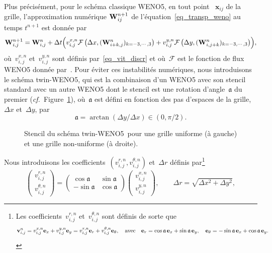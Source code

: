 \documentclass[11pt]{amsart}
\numberwithin{equation}{section}
\newcommand{\W}{{\bf W}}
\newcommand{\ang}{{\mathfrak{a}}}
\newcommand{\ex}{{\bf e}_x}
\newcommand{\ey}{{\bf e}_y}
\newcommand{\er}{{\bf e}_r}
\newcommand{\et}{{\bf e}_{\theta}}
\newcommand{\vit}{\mathbf{v}}
\newcommand{\vecx}{\mathbf{x}}
\newcommand{\twinweno}{twin-WENO5}
\newcommand{\cf}{\textit{cf.}~}
\begin{document}
Plus précisément, pour le schéma classique WENO5, en tout point 
~$\vecx_{ij}$ de la grille, l'approximation numérique 
$\W^{n+1}_{ij}$ de l'équation~\eqref{eq_transp_weno} au temps 
$t^{n+1}$ est donnée par
\begin{equation}\label{eq:WENO5}
\W^{n+1}_{i,j}=\W^n_{i,j} + \Delta t \Bigl(v_{i,j}^{x,n}
\mathcal{F}\left(\Delta x,(\W^n_{i+k,j})_{k=-3,\cdots, 3}\right) +
v_{i,j}^{y,n} \mathcal{F}\left(\Delta y,(\W^n_{i,j+k})_{k=-3,\cdots, 3}\right)\Bigr),
\end{equation}
où~$v_{i,j}^{x,n} $ et~$v_{i,j}^{y,n}$ sont définis par~\eqref{eq_vit_discr} et où~$\mathcal{F}$ est le fonction de flux WENO5 donnée par~\cite{Liu1994}. 
Pour éviter ces instabilités numériques, nous introduisons le schéma \twinweno, qui est la combinaison d'un WENO5 avec son stencil standard avec un autre WENO5 dont le stencil est une rotation d'angle~$\ang$ du premier (\cf Figure~\ref{fig:stencil_weno5_twin}), où~$\ang$ est défini en fonction des pas d'espaces de la grille, $\Delta x$ et~$\Delta y$, par 
 $$\ang=\arctan (\Delta y/\Delta x)\in (0,\pi/2). $$
\begin{figure}[h]
  \centering
\subfloat[Grille uniforme~$\thickmuskip=1mu  \Delta x=\Delta y$]{}
\caption{Stencil du schéma \twinweno\ pour une grille uniforme (à gauche)
  et une grille non-uniforme (à droite).} \label{fig:stencil_weno5_twin}
\end{figure} 
Nous introduisons les coefficients~$(v^{r,n}_{i,j},
v^{\theta,n}_{i,j})$ et~$\Delta r$ définis par\footnote{Les coefficients~$v^{r,n}_{i,j}$
  et~$v^{\theta,n}_{i,j}$ sont définis de sorte que 
$$\vit^n_{i,j}=v^{x,n}_{i,j}\ex+v^{y,n}_{i,j}\ey=v^{r,n}_{i,j}\er+v^{\theta,n}_{i,j}\et,\quad\text{avec}\quad 
\er=\cos\ang\,\ex+\sin\ang\,\ey,\quad \et=-\sin\ang\,\ex+\cos\ang\, \ey.$$}
\begin{equation}
\begin{pmatrix}
v^{r,n}_{i,j} \\ v^{\theta,n}_{i,j}
\end{pmatrix} = \begin{pmatrix}
\cos \ang & \sin \ang \\ -\sin \ang & \cos \ang
\end{pmatrix} \begin{pmatrix}
v^{x,n}_{i,j} \\ v^{y,n}_{i,j}
\end{pmatrix}, \qquad  \Delta r=\sqrt{\Delta x^2+\Delta y^2},
\end{equation}
\end{document}
